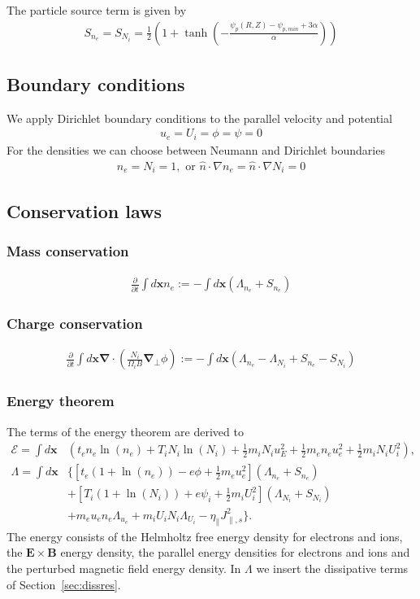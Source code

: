 \documentclass{hitec} %
\renewcommand{\vec}[1]{\boldsymbol{#1}}
\begin{document}
The particle source term is given by
\begin{align}
  S_{n_e} = S_{N_i} = \frac{1}{2}\left( 1 + \tanh\left( - \frac{\psi_p(R,Z) - \psi_{p,min} + 3\alpha}{\alpha} \right) \right)
  \label{}
\end{align}
\subsection{Boundary conditions}
We apply Dirichlet boundary conditions to the parallel velocity and potential
\begin{align}
u_e = U_i = \phi = \psi = 0
\end{align}
For the densities we can choose between Neumann and Dirichlet boundaries
\begin{align}
n_e = N_i = 1, \text{ or } \hat n \cdot \nabla n_e = \hat n \cdot \nabla N_i = 0
\end{align}
\subsection{Conservation laws}
\subsubsection{Mass conservation}
\begin{align}
  \frac{\partial}{\partial t} \int d\vec{x} n_e :=  - \int d\vec{x} (\Lambda_{n_e}+S_{n_e})
\end{align}
\subsubsection{Charge conservation}
\begin{align}
  \frac{\partial}{\partial t} \int d\vec{x} \vec{\nabla} \cdot\left(\frac{N_i}{\Omega_i B} \vec{\nabla}_\perp \phi\right) :=  - \int d\vec{x} (\Lambda_{n_e} - \Lambda_{N_i} + S_{n_e} - S_{N_i})
\end{align}
\subsubsection{Energy theorem}
The terms of the energy theorem are derived to
\begin{align}
  \mathcal{E}= \int  d\vec{x} & \left( t_e n_e \ln{(n_e)} +T_i N_i\ln{(N_i)}+  \frac{1}{2} m_i N_i u_E^2 +\frac{1}{2} m_e  n_e u_e^2 +\frac{1}{2} m_i  N_i U_i^2  \right),\\
  \Lambda =  \int d\vec{x} & \bigg\{  \left[t_e\left( 1+\ln{(n_e)}\right) -e \phi + \frac{1}{2} m_e u_e^2 \right](\Lambda_{n_e} + S_{n_e})
  \nonumber\\ &
+\left[T_i\left( 1+\ln{(N_i)}\right) +e \psi_i + \frac{1}{2} m_i U_i^2 \right](\Lambda_{N_i}+S_{N_i})
\nonumber \\ &
+ m_e u_e n_e \Lambda_{u_e}+m_iU_i N_i \Lambda_{U_i} - \eta_\parallel J_{\parallel,s}^2\bigg\}.
\end{align}
The energy consists of the Helmholtz free energy density for electrons and ions, the \(\vec{E} \times \vec{B}\) energy density, the parallel energy densities for electrons and ions and the perturbed magnetic field energy density.
In \(\Lambda\) we insert the dissipative terms of Section~\ref{sec:dissres}. \\
\end{document}
